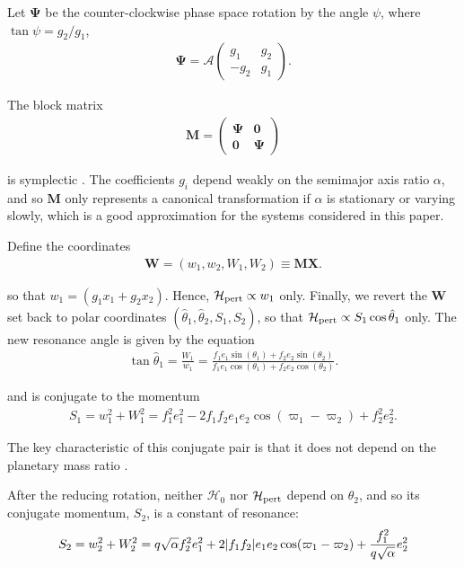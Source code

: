 \documentclass[usenatbib,twocolumn]{mnras}
\renewcommand{\v}[1]{\boldsymbol{ #1 }}
\DeclarePairedDelimiter{\abs}{|}{|}
\begin{document}
\noindent
Let \(\v \Psi\) be the
counter-clockwise phase space rotation by the angle \(\psi\), where \(\tan\psi=
g_2/g_1\),
\begin{align}
  \v \Psi =  \mathcal{A}
  \begin{pmatrix}
    g_1 & g_2 \\
    -g_2 & g_1 
  \end{pmatrix}.
\end{align}

\noindent The block matrix
\begin{align}
  \v M =
  \begin{pmatrix}
    \v \Psi & \v 0 \\
    \v 0 & \v \Psi
  \end{pmatrix}
\end{align}

\noindent is symplectic \citep{goldstein_classical_2000}.
The coefficients \(g_i\) depend weakly on the semimajor axis ratio
\(\alpha\), and so \(\v M\) only represents a canonical transformation if
\(\alpha\) is stationary or varying slowly, which is a good
approximation for the systems considered in this paper.

Define the coordinates
\begin{align}
   \v W = (w_1, w_2, W_1, W_2) \equiv \v M \v X.
\end{align}

\noindent so that \(w_1 = (g_1 x_1 + g_2 x_2)\).  Hence,
\(\mathcal H_{\rm pert}\propto w_1\) only.  Finally, we revert the \(\v
W\) set back to polar coordinates
\((\hat\theta_1,\hat\theta_2,S_1,S_2)\), so that \(\mathcal H_{\rm pert}\propto S_1\cos\hat\theta_1\)
only.
The new resonance angle is
given by the equation
\begin{align}
\label{hattheta}
  \tan\hat{\theta}_1 = \frac{W_1}{w_1} = \frac{f_1 e_1\sin(\theta_1)
  + f_2e_2\sin(\theta_2)}{f_1e_1\cos(\theta_1) + f_2e_2\cos(\theta_2)}.
\end{align}

\noindent
and is conjugate to the momentum
\begin{align}
  S_1 = w_1^2 + W_1^2 = f_1^2e_1^2
  - 2f_1f_2e_1e_2\cos(\varpi_1 - \varpi_2) + f_2^2e_2^2.
\end{align}

\noindent
The key characteristic of this conjugate pair is that it does not depend
on the planetary mass ratio \citep[e.g.][]{deck13_first_order_reson_overl_stabil}.

After the reducing rotation, neither \(\mathcal H_0\) nor \(\mathcal
H_{\rm pert}\) depend on \(\hat\theta_2\), and so its conjugate momentum,
\(S_2\), is a constant of resonance:
\begin{align}
\label{eq:appS2deriv}
  S_2 = w_2^2 + W_2^2 = q\sqrt{\alpha}f_2^2e_1^2
+2\abs{f_1f_2}e_1e_2\cos(\varpi_1-\varpi_2) + \frac{f_1^2}{q\sqrt\alpha}e_2^2
\end{align}
\end{document}
